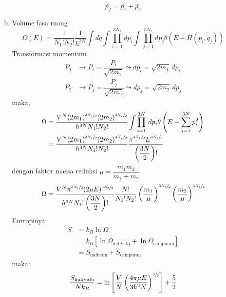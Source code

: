 \begin{enumerate}
\begin{enumerate}[(a)]
\begin{equation*}
            \bar{p_f}=\bar{p_1}+\bar{p_2}
            \end{equation*}
    \item Volume fasa ruang
    \begin{equation*}
        \Omega(E)=\dfrac{1}{N_1!N_2!}\dfrac{1}{h^{3N}}\int dq\int\prod_{i=1}^{3N_1}dp_i\int\prod_{j=1}^{3N_2}dp_j \theta(E-H(p_i,q_j))
    \end{equation*}
    Transformasi momentum
    \begin{equation*}
        \begin{split}
            P_1&\rightarrow P_i=\dfrac{P_i}{\sqrt{2m_1}}\leadsto dp_i=\sqrt{2m_1}\,dp_i\\
            P_2&\rightarrow P_j=\dfrac{P_j}{\sqrt{2m_2}}\leadsto dp_j=\sqrt{2m_2}\,dp_j
        \end{split}
    \end{equation*}
    maka,
    \begin{equation*}
        \begin{split}
            \Omega&=\dfrac{V^N(2m_1)^{\sfrac{3N_1}{2}}(2m_2)^{\sfrac{3N_2}{2}}}{h^{3N}N_1!N_2!}\int\prod_{i=1}^{3N}\,dp_i\theta\left(E-\sum_{i=1}^{3N}p_i ^2\right)\\
            &=\dfrac{V^N(2m_1)^{\sfrac{3N_1}{2}}(2m_2)^{\sfrac{3N_2}{2}}}{h^{3N}N_1!N_2!}\dfrac{\pi^{\sfrac{3N_1}{2}}E^{\sfrac{3N_1}{2}}}{\left(\dfrac{3N}{2}\right)!}
        \end{split}
    \end{equation*}
    dengan faktor massa reduksi $\mu=\dfrac{m_1m_2}{m_1+m_2}$
    \begin{equation*}
        \Omega=\dfrac{V^N\pi^{\sfrac{3N_1}{2}}(2\mu E)^{\sfrac{3N_2}{2}}}{h^{3N}N_1!\left(\dfrac{3N}{2}\right)!}\dfrac{N!}{N_1!N_2!}\left(\dfrac{m_1}{\mu}\right)^{\sfrac{3N_1}{2}}\left(\dfrac{m_2}{\mu}\right)^{\sfrac{3N_1}{2}}
    \end{equation*}
    Entropinya:
    \begin{equation*}
        \begin{split}
            S&=k_B\ln\Omega\\
            &=k_B\left[\ln\Omega_{\text{individu}}+\ln\Omega_{\text{campuran}}\right]\\
            &=S_{\text{individu}}+S_{\text{campuran}}
        \end{split}
    \end{equation*}
    maka:
    \begin{equation*}
        \dfrac{S_{\text{individu}}}{Nk_B}=\ln\left[\dfrac{V}{N}\left(\dfrac{4\pi\mu E}{3h^2N}\right)^{\sfrac{3}{2}}\right]+\dfrac{5}{2}

\end{equation*}
\end{enumerate}
\end{enumerate}
